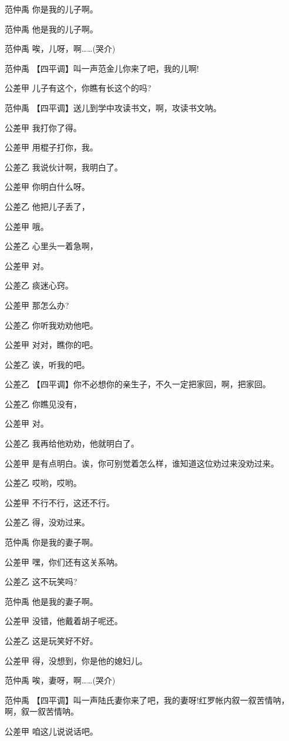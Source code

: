 范仲禹 你是我的儿子啊。

范仲禹 他是我的儿子啊。

范仲禹 唉，儿呀，啊\ldots{}\ldots{}(哭介)

范仲禹 【四平调】叫一声范金儿你来了吧，我的儿啊!

公差甲 儿子有这个，你瞧有长这个的吗?

范仲禹 【四平调】送儿到学中攻读书文，啊，攻读书文呐。

公差甲 我打你了得。

公差甲 用棍子打你，我。

公差乙 我说伙计啊，我明白了。

公差甲 你明白什么呀。

公差乙 他把儿子丢了，

公差甲 哦。

公差乙 心里头一着急啊，

公差甲 对。

公差乙 痰迷心窍。

公差甲 那怎么办?

公差乙 你听我劝劝他吧。

公差甲 对对，瞧你的吧。

公差乙 诶，听我的吧。

公差乙 【四平调】你不必想你的亲生子，不久一定把家回，啊，把家回。

公差乙 你瞧见没有，

公差甲 对。

公差乙 我再给他劝劝，他就明白了。

公差甲 是有点明白。诶，你可别觉着怎么样，谁知道这位劝过来没劝过来。

公差乙 哎哟，哎哟。

公差甲 不行不行，这还不行。

公差乙 得，没劝过来。

范仲禹 你是我的妻子啊。

公差甲 嘿，你们还有这关系呐。

公差乙 这不玩笑吗?

范仲禹 他是我的妻子啊。

公差甲 没错，他戴着胡子呢还。

公差乙 这是玩笑好不好。

公差甲 得，没想到，你是他的媳妇儿。

范仲禹 唉，妻呀，啊\ldots{}\ldots{}(哭介)

范仲禹
【四平调】叫一声陆氏妻你来了吧，我的妻呀!红罗帐内叙一叙苦情呐，啊，叙一叙苦情呐。

公差甲 咱这儿说说话吧。

